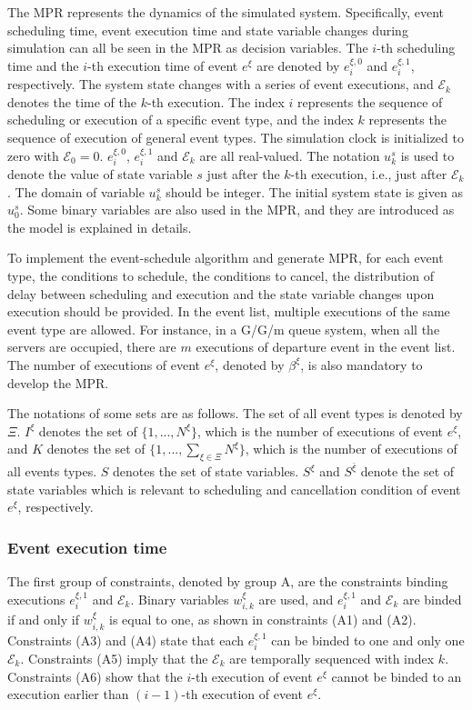 \documentclass[]{interact}
\theoremstyle{plain}%
\theoremstyle{definition}
\theoremstyle{remark}
\begin{document}
The MPR represents the dynamics of the simulated system. Specifically, event scheduling time, event execution time and state variable changes during simulation can all be seen in the MPR as decision variables. The $i$-th scheduling time and the $i$-th execution time of event $e^{\xi}$ are denoted by $e^{\xi,0}_{i}$ and $e^{\xi,1}_{i}$, respectively. The system state changes with a series of event executions,  and $\mathcal{E}_k$ denotes the time of the $k$-th execution. The index $i$ represents the sequence of scheduling or execution of a specific event type, and the index $k$ represents the sequence of execution of general event types. The simulation clock is initialized to zero with $\mathcal{E}_0 = 0$. $e^{\xi,0}_{i}$, $e^{\xi,1}_{i}$ and $\mathcal{E}_k$ are all real-valued. The notation $u^s_k$ is used to denote the value of state variable $s$ just after the $k$-th execution, i.e., just after $\mathcal{E}_k$. The domain of variable $u^s_k$ should be integer. The initial system state is given as $u^s_0$. Some binary variables are also used in the MPR, and they are introduced as the model is explained in details. 


To implement the event-schedule algorithm and generate MPR, for each event type, the conditions to schedule, the conditions to cancel, the distribution of  delay between scheduling and execution and the state variable changes upon execution should be provided. In the event list, multiple executions of the same event type are allowed. For instance, in a G/G/m queue system, when all the servers are occupied, there are $m$ executions of departure event in the event list. The number of executions of event $e^{\xi}$, denoted by $\beta^{\xi}$, is also mandatory to develop the MPR.

The notations of some sets are as follows. The set of all event types is denoted by $\Xi$. $I^{\xi}$ denotes the set of $\{1,...,N^{\xi}\}$, which is the number of executions of event $e^{\xi}$, and $K$ denotes the set of $\{1,...,\sum_{\xi\in\Xi}N^{\xi}\}$, which is the number of executions of all events types. $S$ denotes the set of state variables. $S^{\xi}$ and $S^{\bar{\xi}}$ denote the set of state variables which is relevant to scheduling and cancellation condition of event $e^{\xi}$, respectively.


\subsubsection{Event execution time}
The first group of constraints, denoted by group A, are the constraints binding executions $e^{\xi,1}_i$ and $\mathcal{E}_k$. Binary variables $w^{\xi}_{i,k}$ are used, and $e^{\xi,1}_i$ and $\mathcal{E}_k$ are binded if and only if $w^{\xi}_{i,k}$ is equal to one, as shown in constraints (A1) and (A2). Constraints (A3) and (A4) state that each $e^{\xi,1}_i$ can be binded to one and only one $\mathcal{E}_k$. Constraints (A5) imply that the $\mathcal{E}_{k}$ are temporally sequenced with index $k$. Constraints (A6) show that the $i$-th execution of event $e^{\xi}$ cannot be binded to an execution earlier than $(i-1)$-th execution of event $e^{\xi}$.
\end{document}
